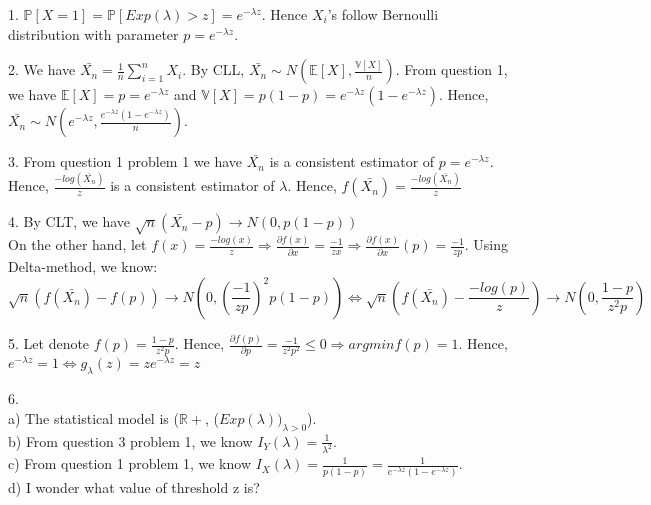 \documentclass[10pt]{article}
\newenvironment{problem}[2][Problem]{\begin{trivlist}
\item[\hskip \labelsep {\bfseries #1}\hskip \labelsep {\bfseries #2.}]}{\end{trivlist}}
\begin{document}
\begin{problem}{3}
\item 1. $\mathbb{P}[X=1]=\mathbb{P}[Exp(\lambda) > z]= e^{-\lambda z} $. Hence $X_{i}$'s follow Bernoulli distribution with parameter $p=e^{-\lambda z}$.
\item 2. We have $\bar{X_n}=\frac{1}{n}\sum_{i=1}^{n}X_i$. By CLL, $\bar{X_n} \sim N(\mathbb{E}[X], \frac{\mathbb{V}[X]}{n})$. From question 1, we have $\mathbb{E}[X]=p=e^{-\lambda z}$ and $\mathbb{V}[X]=p(1-p)=e^{-\lambda z}(1- e^{-\lambda z})$. Hence, $\bar{X_n} \sim N(e^{-\lambda z}, \frac{e^{-\lambda z}(1- e^{-\lambda z})}{n} )$.
\item 3. From question 1 problem 1 we have $\bar{X_n}$ is a consistent estimator of $p =  e^{-\lambda z}$. Hence, $\frac{-log(\bar{X_n})}{z}$ is a consistent estimator of $\lambda$. Hence, $f(\bar{X_n})=\frac{-log(\bar{X_n})}{z}$


\item 4. By CLT, we have $\sqrt{n}(\bar{X_n} -p) \longrightarrow N(0, p(1-p))$\\
On the other hand, let $f(x)=\frac{-log(x)}{z} \Rightarrow \frac{\partial f(x)}{\partial x}=\frac{-1}{zx} \Rightarrow \frac{\partial f(x)}{\partial x} (p)=\frac{-1}{zp}$.
Using Delta-method, we know:
\[\sqrt{n}(f(\bar{X_n}) - f(p))  \longrightarrow N(0, (\frac{-1}{zp})^2 p(1-p)) \Leftrightarrow \sqrt{n}(f(\bar{X_n}) - \frac{-log(p)}{z})  \longrightarrow N(0, \frac{1-p}{z^2p})\]

\item 5.  
Let denote $f(p)= \frac{1-p}{z^2p}$. Hence, $\frac{\partial f(p)}{\partial p}= \frac{-1}{z^2p^2} \leqslant 0  \Rightarrow argmin f(p)=1$. Hence, $e^{-\lambda z}=1 \Leftrightarrow g_{\lambda}(z)= ze^{-\lambda z}=z $
\item 6.\\ 
a) The statistical model is ($\mathbb{R}+$, ($Exp(\lambda))_{\lambda>0}$).\\
b) From question 3 problem 1, we know $I_{Y}(\lambda)=\frac{1}{\lambda^2}$.\\
c) From question 1 problem 1, we know $I_{X}(\lambda)=\frac{1}{p(1-p)}=\frac{1}{e^{-\lambda z}(1-e^{-\lambda z})}$.\\
d) I wonder what value of threshold z is?

\end{problem}
\end{document}
